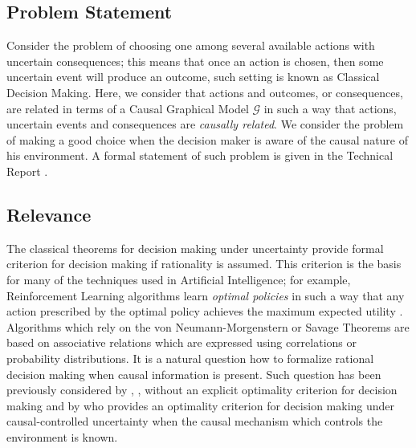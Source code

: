\documentclass[english,letterpaper,12pt,final]{article}
\theoremstyle{definition}
\begin{document}
\subsection{Problem Statement}
Consider the problem of choosing one among several available actions with uncertain consequences; this means that once an action is chosen, then some uncertain event will produce an outcome, such setting is known as Classical Decision Making. Here, we consider that actions and outcomes, or consequences, are related in terms of a Causal Graphical Model $\mathcal{G}$ in such a way that actions, uncertain events and consequences are \textit{causally related}. We consider the problem of making a good choice when the decision maker is aware of the causal nature of his environment. A formal statement of such problem is given in the Technical Report \cite{gonzalez2019causal}.

\subsection{Relevance}
The classical theorems for decision making under uncertainty provide formal criterion for decision making if rationality is assumed. This criterion is the basis for many of the techniques used in Artificial Intelligence; for example, Reinforcement Learning algorithms learn \textit{optimal policies} in such a way that any action prescribed by the optimal policy achieves the maximum expected utility \citep{sutton1998reinforcement,Puterman:1994:MDP:528623}. Algorithms which rely on the von Neumann-Morgenstern or Savage Theorems are based on associative relations which are expressed using correlations or probability distributions. It is a natural question how to formalize rational decision making when causal information is present. Such question has been previously considered by \cite{nozick1969newcomb}, \cite{lewis1981causal}, \cite{joyce1999foundations} without an explicit optimality criterion for decision making and by \cite{pearl2009causality} who provides an optimality criterion for decision making under causal-controlled uncertainty when the causal mechanism which controls the environment is known.
\end{document}
